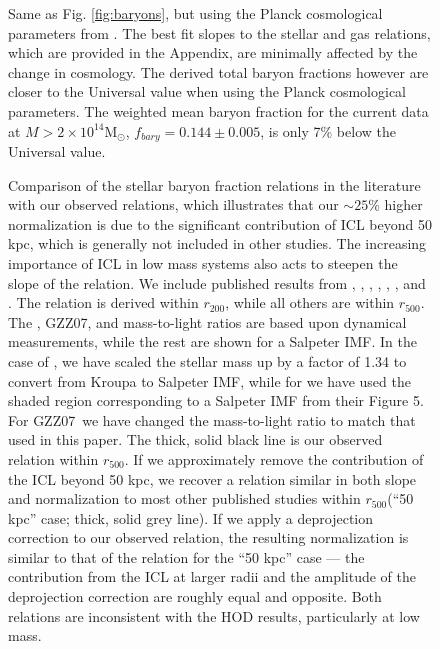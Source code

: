 \documentclass[preprint]{emulateapj}
\newcommand{\msun}{M$_\odot$}
\newcommand\rfive{$r_{500}$}
\newcommand\rtwo{$r_{200}$}
\newcommand\ptwo{GZZ07}
\begin{document}
\begin{figure*}
\caption{Same as Fig. \ref{fig:baryons}, but using the Planck cosmological parameters from \citep{planckcosmology2013}. The best fit slopes to the
stellar and gas relations, which are provided in the Appendix, are minimally affected by the change in cosmology. The derived total baryon fractions however
 are closer to the Universal value when using the Planck cosmological parameters.
The weighted mean baryon fraction for the current data at $M>2\times10^{14}$\msun, $f_{bary}=0.144\pm 0.005$, is only 7\% below the Universal value. } 
\label{fig:planckbaryons}
\end{figure*}






\begin{figure}
\caption{
Comparison of the stellar baryon fraction relations in the literature with our observed relations, which illustrates
that our $\sim25$\% higher normalization is due to the significant contribution of ICL beyond 50 kpc, which is generally not included
in other studies. The increasing importance of ICL in low mass systems also acts to steepen the slope of the relation.
We  include published results from \citet[][Lin03]{lin2003}, \citet[][Gio09]{giodini2009}, \citet[][And10]{andreon2010}, \citet[][Zha11]{zhang2011}, \citet[][Lag11]{lagana2011}, \citet[][Lin12]{lin2012}, and \citet[][Lea12]{leauthaud2012}.  The \citet{andreon2010} relation is derived within \rtwo, while all others are within \rfive. The \citet{lin2003}, \ptwo, and \citet{andreon2010} mass-to-light ratios are based upon dynamical measurements, while the rest are shown for a Salpeter IMF. In the case of \citet{lin2012}, we have scaled the stellar mass up by a factor of 1.34 to convert from Kroupa to Salpeter IMF, while for \citet{leauthaud2012} we have used the shaded region corresponding to a Salpeter IMF from their Figure 5. For \ptwo\ we have changed the mass-to-light ratio to match that used in this paper.
The thick, solid black line is our observed relation within \rfive. If we approximately remove the contribution of the ICL beyond 50 kpc, we recover a relation similar in both slope and normalization to most other published studies within \rfive (``50 kpc'' case; thick, solid grey line).  If we apply a deprojection correction to our observed relation, the resulting normalization is similar to that of the relation for the ``50 kpc'' case
--- the contribution from the ICL at larger radii and the amplitude of the deprojection correction are roughly equal and opposite.  Both relations are inconsistent with the \citet{leauthaud2012} HOD results, particularly at low mass.
\label{fig:comp}}
\end{figure}
\end{document}
